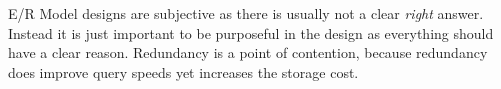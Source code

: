 \documentclass{report}
\begin{document}
\begin{note}
    E/R Model designs are subjective as there is usually not a clear \textit{right} answer. Instead it is just important to be purposeful in the design as everything should have a clear reason. Redundancy is a point of contention, because redundancy does improve query speeds yet increases the storage cost.
\end{note}
\end{document}
